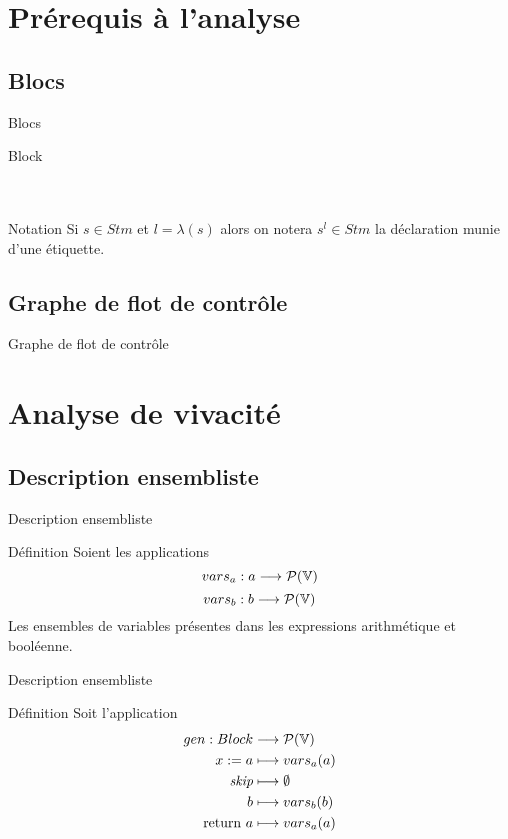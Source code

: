 \documentclass{beamer}
\begin{document}
\section{Prérequis à l'analyse}
\subsection{Blocs}
\begin{frame}{Blocs}
	\begin{dtype}{Block}
		\\
		\\
		\akind{\sskip}\\
	\end{dtype}
	\begin{block}{Notation}
		Si $s \in Stm$ et $l = \lambda(s)$ alors on notera $s^l \in Stm$ la déclaration munie d'une étiquette.
	\end{block}
\end{frame}

\subsection{Graphe de flot de contrôle}
\begin{frame}{Graphe de flot de contrôle}
	\begin{center}
		
	\end{center}
\end{frame}

\section{Analyse de vivacité}
\subsection{Description ensembliste}
\begin{frame}{Description ensembliste}
	\begin{block}{Définition}
		Soient les applications
		\[vars_a : a \longrightarrow \mathcal{P}(\mathbb{V})\]
		\[vars_b : b \longrightarrow \mathcal{P}(\mathbb{V})\]
		Les ensembles de variables présentes dans les expressions arithmétique et booléenne.
	\end{block}
\end{frame}

\begin{frame}{Description ensembliste}
	\begin{block}{Définition}
		Soit l'application
		\begin{align*}
			gen : Block &\longrightarrow \mathcal{P}(\mathbb{V})\\
			{x}\space:=\space{a} &\longmapsto vars_a(a)\\
			\textit{skip} &\longmapsto \emptyset\\
			b &\longmapsto vars_b(b)\\
			\text{return }{a} &\longmapsto vars_a(a)
		\end{align*}
	\end{block}
\end{frame}
\end{document}
